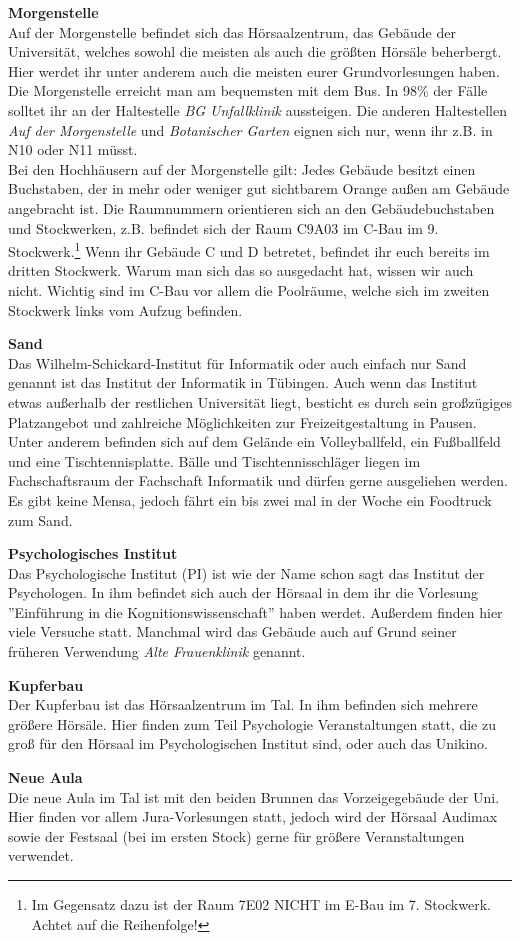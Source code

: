 \textbf{Morgenstelle}\\
Auf der Morgenstelle befindet sich das Hörsaalzentrum, das Gebäude der Universität, welches sowohl die meisten als auch die größten Hörsäle beherbergt. Hier werdet ihr unter anderem auch die meisten eurer Grundvorlesungen haben.\\
Die Morgenstelle erreicht man am bequemsten mit dem Bus. In 98\% der Fälle solltet ihr an der Haltestelle \emph{BG Unfallklinik} aussteigen. Die anderen Haltestellen \emph{Auf der Morgenstelle} und \emph{Botanischer Garten} eignen sich nur, wenn ihr z.B. in N10 oder N11 müsst.\\ Bei den Hochhäusern auf der Morgenstelle gilt: Jedes Gebäude besitzt einen Buchstaben, der in mehr oder weniger gut sichtbarem Orange außen am Gebäude angebracht ist.  Die Raumnummern orientieren sich an den Gebäudebuchstaben und Stockwerken, z.B. befindet sich der Raum C9A03 im C-Bau im 9. Stockwerk.\footnote{Im Gegensatz dazu ist der Raum 7E02 NICHT im E-Bau im 7. Stockwerk. Achtet auf die Reihenfolge!} Wenn ihr Gebäude C und D betretet, befindet ihr euch bereits im dritten Stockwerk. Warum man sich das so ausgedacht hat, wissen wir auch nicht. Wichtig sind im C-Bau vor allem die Poolräume, welche sich im zweiten Stockwerk links vom Aufzug befinden.

\textbf{Sand}\\
Das Wilhelm-Schickard-Institut für Informatik oder auch einfach nur Sand genannt ist das Institut der Informatik in Tübingen. Auch wenn das Institut etwas außerhalb der restlichen Universität liegt, besticht es durch sein großzügiges Platzangebot und zahlreiche Möglichkeiten zur Freizeitgestaltung in Pausen. Unter anderem befinden sich auf dem Gelände ein Volleyballfeld, ein Fußballfeld und eine Tischtennisplatte. Bälle und Tischtennisschläger liegen im Fachschaftsraum der Fachschaft Informatik und dürfen gerne ausgeliehen werden. Es gibt keine Mensa, jedoch fährt ein bis zwei mal in der Woche ein Foodtruck zum Sand.

\textbf{Psychologisches Institut}\\
Das Psychologische Institut (PI) ist wie der Name schon sagt das Institut der Psychologen. In ihm befindet sich auch der Hörsaal in dem ihr die Vorlesung ''Einführung in die Kognitionswissenschaft'' haben werdet. Außerdem finden hier viele Versuche statt. Manchmal wird das Gebäude auch auf Grund seiner früheren Verwendung \textit{Alte Frauenklinik} genannt.

\textbf{Kupferbau}\\
Der Kupferbau ist das Hörsaalzentrum im Tal. In ihm befinden sich mehrere größere Hörsäle. Hier finden zum Teil Psychologie Veranstaltungen statt, die zu groß für den Hörsaal im Psychologischen Institut sind, oder auch das Unikino.

\textbf{Neue Aula}\\
Die neue Aula im Tal ist mit den beiden Brunnen das Vorzeigegebäude der Uni. Hier finden vor allem Jura-Vorlesungen statt, jedoch wird der Hörsaal Audimax sowie der Festsaal (bei im ersten Stock) gerne für größere Veranstaltungen verwendet.

\vfill
